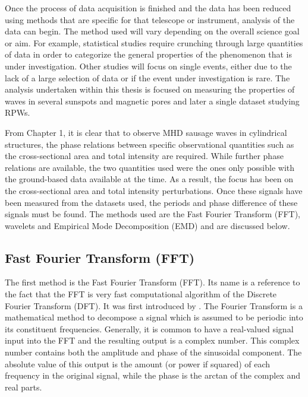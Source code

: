	Once the process of data acquisition is finished and the data has been reduced using methods that are specific for that telescope or instrument, analysis of the data can begin.
    The method used will vary depending on the overall science goal or aim.
    For example, statistical studies require crunching through large quantities of data in order to categorize the general properties of the phenomenon that is under investigation. 
	Other studies will focus on single events, either due to the lack of a large selection of data or if the event under investigation is rare.
	The analysis undertaken within this thesis is focused on measuring the properties of waves in several sunspots and magnetic pores and later a single dataset studying RPWs.
   	
	From Chapter 1, it is clear that to observe MHD sausage waves in cylindrical structures, the phase relations between specific observational quantities such as the cross-sectional area and total intensity are required.
    While further phase relations are available, the two quantities used were the ones only possible with the ground-based data available at the time.
    As a result, the focus has been on the cross-sectional area and total intensity perturbations. 
    Once these signals have been measured from the datasets used, the periods and phase difference of these signals must be found.
    The methods used are the Fast Fourier Transform (FFT), wavelets and Empirical Mode Decomposition (EMD) and are discussed below.
     
\subsection{Fast Fourier Transform (FFT)}

	The first method is the Fast Fourier Transform (FFT).
	Its name is a reference to the fact that the FFT is very fast computational algorithm of the Discrete Fourier Transform (DFT).
    It was first introduced by \cite{cooley1965algorithm}.
	The Fourier Transform is a mathematical method to decompose a signal which is assumed to be periodic into its constituent frequencies.
	Generally, it is common to have a real-valued signal input into the FFT and the resulting output is a complex number.
	This complex number contains both the amplitude and phase of the sinusoidal component.
	The absolute value of this output is the amount (or power if squared) of each frequency in the original signal, while the phase is the arctan of the complex and real parts. 
	
